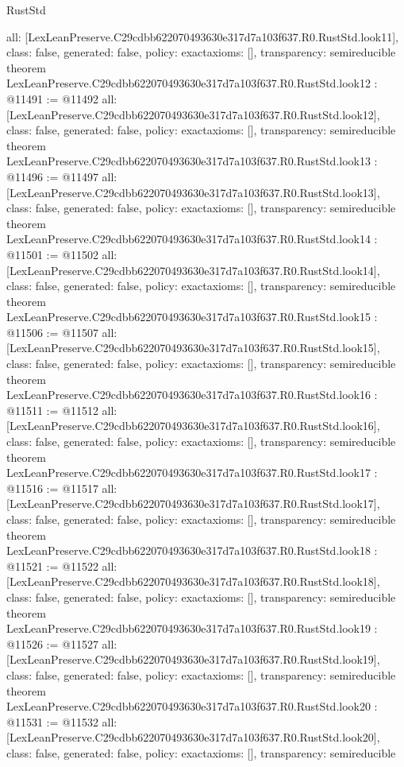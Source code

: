 \begin{lexlean}{RustStd}
\begin{coremodule}
{  all: [LexLeanPreserve.C29cdbb622070493630e317d7a103f637.R0.RustStd.look11],
  class: false,
  generated: false,
  policy: exact{axioms: []},
  transparency: semireducible
}
theorem LexLeanPreserve.C29cdbb622070493630e317d7a103f637.R0.RustStd.look12 : @11491 := @11492 {
  all: [LexLeanPreserve.C29cdbb622070493630e317d7a103f637.R0.RustStd.look12],
  class: false,
  generated: false,
  policy: exact{axioms: []},
  transparency: semireducible
}
theorem LexLeanPreserve.C29cdbb622070493630e317d7a103f637.R0.RustStd.look13 : @11496 := @11497 {
  all: [LexLeanPreserve.C29cdbb622070493630e317d7a103f637.R0.RustStd.look13],
  class: false,
  generated: false,
  policy: exact{axioms: []},
  transparency: semireducible
}
theorem LexLeanPreserve.C29cdbb622070493630e317d7a103f637.R0.RustStd.look14 : @11501 := @11502 {
  all: [LexLeanPreserve.C29cdbb622070493630e317d7a103f637.R0.RustStd.look14],
  class: false,
  generated: false,
  policy: exact{axioms: []},
  transparency: semireducible
}
theorem LexLeanPreserve.C29cdbb622070493630e317d7a103f637.R0.RustStd.look15 : @11506 := @11507 {
  all: [LexLeanPreserve.C29cdbb622070493630e317d7a103f637.R0.RustStd.look15],
  class: false,
  generated: false,
  policy: exact{axioms: []},
  transparency: semireducible
}
theorem LexLeanPreserve.C29cdbb622070493630e317d7a103f637.R0.RustStd.look16 : @11511 := @11512 {
  all: [LexLeanPreserve.C29cdbb622070493630e317d7a103f637.R0.RustStd.look16],
  class: false,
  generated: false,
  policy: exact{axioms: []},
  transparency: semireducible
}
theorem LexLeanPreserve.C29cdbb622070493630e317d7a103f637.R0.RustStd.look17 : @11516 := @11517 {
  all: [LexLeanPreserve.C29cdbb622070493630e317d7a103f637.R0.RustStd.look17],
  class: false,
  generated: false,
  policy: exact{axioms: []},
  transparency: semireducible
}
theorem LexLeanPreserve.C29cdbb622070493630e317d7a103f637.R0.RustStd.look18 : @11521 := @11522 {
  all: [LexLeanPreserve.C29cdbb622070493630e317d7a103f637.R0.RustStd.look18],
  class: false,
  generated: false,
  policy: exact{axioms: []},
  transparency: semireducible
}
theorem LexLeanPreserve.C29cdbb622070493630e317d7a103f637.R0.RustStd.look19 : @11526 := @11527 {
  all: [LexLeanPreserve.C29cdbb622070493630e317d7a103f637.R0.RustStd.look19],
  class: false,
  generated: false,
  policy: exact{axioms: []},
  transparency: semireducible
}
theorem LexLeanPreserve.C29cdbb622070493630e317d7a103f637.R0.RustStd.look20 : @11531 := @11532 {
  all: [LexLeanPreserve.C29cdbb622070493630e317d7a103f637.R0.RustStd.look20],
  class: false,
  generated: false,
  policy: exact{axioms: []},
  transparency: semireducible
}
\end{coremodule}
\end{lexlean}
